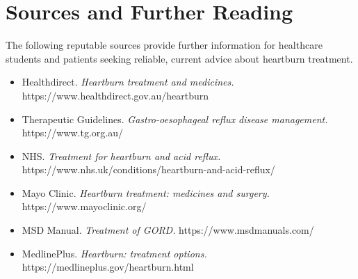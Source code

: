 \section*{Sources and Further Reading}
The following reputable sources provide further information for healthcare students and patients seeking reliable, current advice about heartburn treatment.

\begin{itemize}
    \item Healthdirect. \textit{Heartburn treatment and medicines.} https://www.healthdirect.gov.au/heartburn
    \item Therapeutic Guidelines. \textit{Gastro-oesophageal reflux disease management.} https://www.tg.org.au/
    \item NHS. \textit{Treatment for heartburn and acid reflux.} https://www.nhs.uk/conditions/heartburn-and-acid-reflux/
    \item Mayo Clinic. \textit{Heartburn treatment: medicines and surgery.} https://www.mayoclinic.org/
    \item MSD Manual. \textit{Treatment of GORD.} https://www.msdmanuals.com/
    \item MedlinePlus. \textit{Heartburn: treatment options.} https://medlineplus.gov/heartburn.html
\end{itemize}

